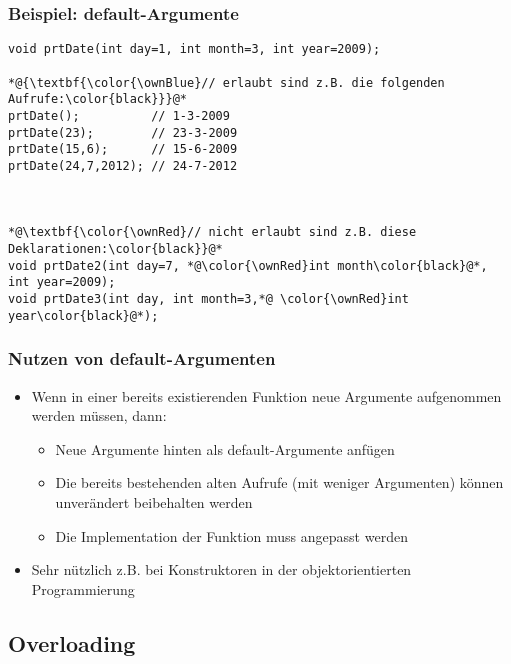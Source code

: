 \subsubsection{Beispiel: default-Argumente\hfill}
\label{sec:Beispiel: default-Argumente}
\noindent
\begin{minipage}{\linewidth}
\begin{lstlisting}
void prtDate(int day=1, int month=3, int year=2009);
	
*@{\textbf{\color{\ownBlue}// erlaubt sind z.B. die folgenden Aufrufe:\color{black}}}@*
prtDate();			// 1-3-2009
prtDate(23);		// 23-3-2009
prtDate(15,6);		// 15-6-2009
prtDate(24,7,2012);	// 24-7-2012

	

*@\textbf{\color{\ownRed}// nicht erlaubt sind z.B. diese Deklarationen:\color{black}}@*
void prtDate2(int day=7, *@\color{\ownRed}int month\color{black}@*, int year=2009);
void prtDate3(int day, int month=3,*@ \color{\ownRed}int year\color{black}@*);
\end{lstlisting}
\end{minipage}

\subsubsection{Nutzen von default-Argumenten\hfill}
\label{sec:Nutzen von default-Argumenten}
\begin{itemize}
	\item Wenn in einer bereits existierenden Funktion neue Argumente aufgenommen werden müssen, dann:
	\begin{itemize}
		\item Neue Argumente hinten als default-Argumente anfügen
		\item Die bereits bestehenden alten Aufrufe (mit weniger Argumenten) können unverändert beibehalten werden
		\item Die Implementation der Funktion muss angepasst werden
	\end{itemize}
	\item Sehr nützlich z.B. bei Konstruktoren in der objektorientierten Programmierung
\end{itemize}


\subsection{Overloading\hfill}
\label{sec:Overloading}

